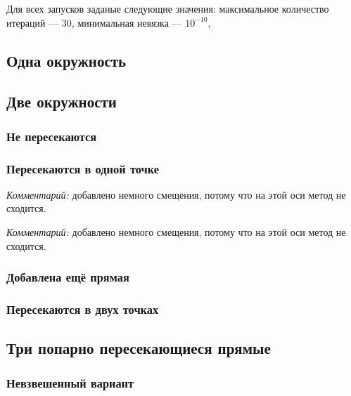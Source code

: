 Для всех запусков заданые следующие значения: максимальное количество итераций --- $30$, минимальная невязка --- $10^{-10}$, 

\subsection{Одна окружность}
\subsection{Две окружности}
\subsubsection{Не пересекаются}
\subsubsection{Пересекаются в одной точке}
\textit{Комментарий:} добавлено немного смещения, потому что на этой оси метод не сходится. 

\textit{Комментарий:} добавлено немного смещения, потому что на этой оси метод не сходится. 

\subsubsection{Добавлена ещё прямая}
\subsubsection{Пересекаются в двух точках}
\subsection{Три попарно пересекающиеся прямые}
\subsubsection{Невзвешенный вариант}
